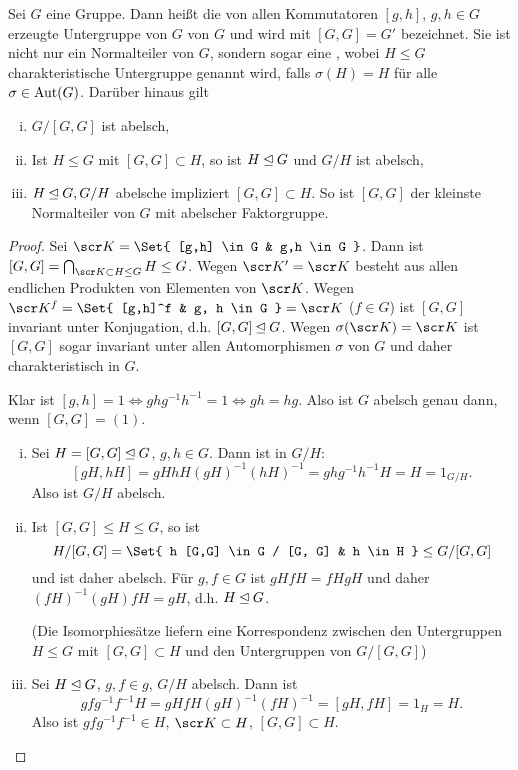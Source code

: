 \begin{kor}
	Sei $G$ eine Gruppe.
	Dann heißt die von allen Kommutatoren $[g,h]$, $g, h \in G$ erzeugte Untergruppe von $G$  von $G$ und wird mit $[G, G] = G'$ bezeichnet.
	Sie ist nicht nur ein Normalteiler von $G$, sondern sogar eine , wobei $H \le G$ charakteristische Untergruppe genannt wird, falls $\sigma(H) = H$ für alle $\sigma \in \operatorname{Aut}(G)$.
	Darüber hinaus gilt
	\begin{enumerate}[i)]
		\item
			$G / [G, G]$ ist abelsch,
		\item
			Ist $H \le G$ mit $[G, G] \subset H$, so ist $H \mathbin{\trianglelefteq} G$ und $G / H$ ist abelsch,
		\item
			$H \mathbin{\trianglelefteq} G, G / H$ abelsche impliziert $[G, G] \subset H$.
			So ist $[G, G]$ der kleinste Normalteiler von $G$ mit abelscher Faktorgruppe.
	\end{enumerate}
	\begin{proof}
		Sei $\scr K = \Set{ [g,h] \in G & g,h \in G }$.
		Dann ist $[G, G] = \bigcap_{\scr K \subset H \le G} H \le G$.
		Wegen $\scr K' = \scr K$ besteht aus allen endlichen Produkten von Elementen von $\scr K$.
		Wegen $\scr K^f = \Set{ [g,h]^f & g, h \in G } = \scr K$ ($f \in G$) ist $[G, G]$ invariant unter Konjugation, d.h. $[G, G] \mathbin{\trianglelefteq} G$.
		Wegen $\sigma(\scr K) = \scr K$ ist $[G, G]$ sogar invariant unter allen Automorphismen $\sigma$ von $G$ und daher charakteristisch in $G$.

		Klar ist $[g,h] = 1 \iff ghg^{-1}h^{-1} = 1 \iff gh = hg$.
		Also ist $G$ abelsch genau dann, wenn $[G, G] = (1)$.

		\begin{enumerate}[i)]
			\item
				Sei $H = [G, G] \mathbin{\trianglelefteq} G$, $g, h \in G$.
				Dann ist in $G / H$:
				\[
					[gH, hH]
					= gH hH (gH)^{-1}(hH)^{-1}
					= ghg^{-1}h^{-1} H
					= H
					= 1_{G / H}.
				\]
				Also ist $G / H$ abelsch.
			\item
				Ist $[G, G] \le H \le G$, so ist
				\[
					H / [G,G] = \Set{ h [G,G] \in G / [G, G] & h \in H } \le G / [G, G]
				\]
				und ist daher abelsch.
				Für $g, f \in G$ ist $gH fH = fH gH$ und daher $(fH)^{-1} (gH) fH = gH$, d.h. $H \mathbin{\trianglelefteq} G$.

				(Die Isomorphiesätze liefern eine Korrespondenz zwischen den Untergruppen $H \le G$ mit $[G, G] \subset H$ und den Untergruppen von $G / [G,G]$)
			\item
				Sei $H \mathbin{\trianglelefteq} G$, $g, f \in g$, $G / H$ abelsch.
				Dann ist
				\[
					gfg^{-1}f^{-1} H
					= gH fH (gH)^{-1} (fH)^{-1}
					= [gH, fH]
					= 1_H
					= H.
				\]
				Also ist $gf g^{-1}f^{-1} \in H$, $\scr K \subset H$, $[G, G] \subset H$.
		\end{enumerate}
	\end{proof}
\end{kor}

